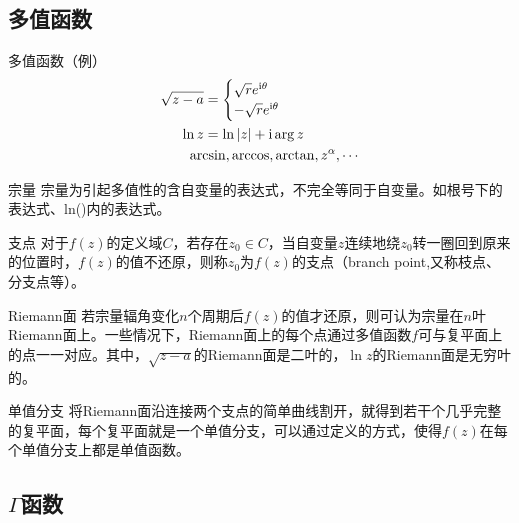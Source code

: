 \documentclass[UTF8,12pt]{ctexart}
\newcommand{\I}{{\rm i}}
\begin{document}
\subsection{多值函数}
\setlength\columnsep{1.3cm}
\begin{multicols}{2}
    \begin{gbox}{多值函数（例）}
        \begin{subequations}
            \begin{align}
                \sqrt{z-a}&=\begin{cases}
                    \sqrt{r}e^{\I\theta}\\
                    -\sqrt{r}e^{\I\theta}
                \end{cases}\\
                \ln z&=\ln|z|+\I\arg z\\
                &\!\!\!\!\!\!\!\arcsin,\arccos,\arctan,z^\alpha,\cdots \notag
            \end{align}
        \end{subequations}
    \end{gbox}
    \begin{wbox}{宗量}
        宗量为引起多值性的含自变量的表达式，不完全等同于自变量。如根号下的表达式、ln()内的表达式。
    \end{wbox}
    \begin{gbox}{支点}
        对于$f(z)$的定义域$C$，若存在$z_0\in C$，当自变量$z$连续地绕$z_0$转一圈回到原来的位置时，$f(z)$的值不还原，则称$z_0$为$f(z)$的支点（branch point,又称枝点、分支点等）。
    \end{gbox}
    \begin{gbox}{Riemann面}
        若宗量辐角变化$n$个周期后$f(z)$的值才还原，则可认为宗量在$n$叶Riemann面上。一些情况下，Riemann面上的每个点通过多值函数$f$可与复平面上的点一一对应。其中，$\sqrt{z-a}$的Riemann面是二叶的，$\ln z$的Riemann面是无穷叶的。
    \end{gbox}
    \begin{gbox}{单值分支}
        将Riemann面沿连接两个支点的简单曲线割开，就得到若干个几乎完整的复平面，每个复平面就是一个单值分支，可以通过定义的方式，使得$f(z)$在每个单值分支上都是单值函数。
    \end{gbox}
\end{multicols}

\newpage
\subsection{$\Gamma$函数}
\end{document}
